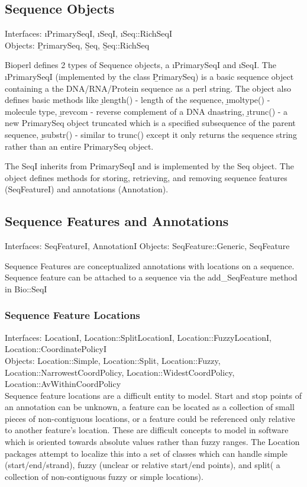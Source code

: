 \documentclass{article}
\begin{document}
\begin{twocolumn}
\subsection{Sequence Objects}
Interfaces: \i{PrimarySeqI}, \i{SeqI}, \i{Seq::RichSeqI}
\\
Objects: \b{PrimarySeq}, \b{Seq}, \b{Seq::RichSeq}

Bioperl defines 2 types of Sequence objects, a \i{PrimarySeqI} and \i{SeqI}.
The \i{PrimarySeqI} (implemented by the class \b{PrimarySeq}) is a basic
sequence object containing a the DNA/RNA/Protein sequence as a perl
string.  The object also defines basic methods like 
\b{\i{length()}} - length of the sequence, 
\b{\i{moltype()}} - molecule type, 
\b{\i{revcom}} - reverse complement of a DNA dnastring, 
\b{\i{trunc()}} - a new PrimarySeq object truncated which is 
a specified subsequence of the parent sequence, 
\b{\i{substr()}} - similar to trunc() except it only returns the sequence string rather than an
entire PrimarySeq object.  
\par 
The SeqI inherits from PrimarySeqI and is implemented by the Seq
object.  The object defines methods for storing, retrieving, and
removing sequence features (SeqFeatureI) and annotations (Annotation).

\subsection{Sequence Features and Annotations}

Interfaces: SeqFeatureI, AnnotationI
Objects: SeqFeature::Generic, SeqFeature

Sequence Features are conceptualized annotations with locations on a
sequence.  Sequence feature can be attached to a sequence via the
add_SeqFeature method in Bio::SeqI 

\subsubsection{Sequence Feature Locations}
Interfaces: LocationI, Location::SplitLocationI,
Location::FuzzyLocationI, Location::CoordinatePolicyI
\\
Objects: Location::Simple, Location::Split, Location::Fuzzy,
Location::NarrowestCoordPolicy, Location::WidestCoordPolicy,
Location::AvWithinCoordPolicy
\\
Sequence feature locations are a difficult entity to model.  Start and
stop points of an annotation can be unknown, a feature can be located
as a collection of small pieces of non-contiguous locations, or a
feature could be referenced only relative to another feature's
location.  These are difficult concepts to model in software which is
oriented towards absolute values rather than fuzzy ranges.   The
Location packages attempt to localize this into a set of classes which
can handle simple (start/end/strand), fuzzy (unclear or relative
start/end points), and split( a collection of non-contiguous fuzzy or simple
locations).
  


\end{twocolumn}
\end{document}
